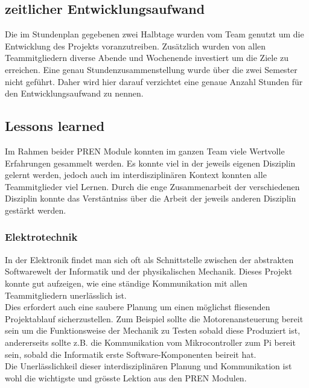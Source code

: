 \documentclass[../../main.tex]{subfiles}
\begin{document}
    \nocite{PiShopPi3ModelBp}
    \nocite{PiShopPiZero}
    \nocite{PiShopBrightPi}
    \nocite{PiShopPiKamera}
    \nocite{PlayZonePassiverBuzzer}
    \nocite{ReicheltStromPi}
    \nocite{ReicheltStromPiAkku}
    \nocite{AliExpressADXL345}
    \nocite{WisIBT2}
    \nocite{WishDCDCConverter}
    \nocite{AliExpressHCSR04}
    \nocite{AliExpressVL53L0X}
    \nocite{AliExpressLM2596}
    \nocite{Distrelec13FR200E}
    \nocite{AliExpress5V33VConverter}
    \nocite{WishTowerpro48}
    \nocite{WishTowerpro48}
    \nocite{MadlerZahnriemen}
    \nocite{MadlerZahnriemenrad}
    \nocite{MadlerKupplung}
    \nocite{MadlerZahnrad}


\pagebreak

\subsection{zeitlicher Entwicklungsaufwand}
Die im Stundenplan gegebenen zwei Halbtage wurden vom Team genutzt um die Entwicklung des Projekts voranzutreiben. Zusätzlich wurden von allen Teammitgliedern diverse Abende und Wochenende investiert um die Ziele zu erreichen. Eine genau Stundenzusammenstellung wurde über die zwei Semester nicht geführt. Daher wird hier darauf verzichtet eine genaue Anzahl Stunden für den Entwicklungsaufwand zu nennen.\\

\subsection{Lessons learned}
Im Rahmen beider PREN Module konnten im ganzen Team viele Wertvolle Erfahrungen gesammelt werden. Es konnte viel in der jeweils eigenen Disziplin gelernt werden, jedoch auch im interdisziplinären Kontext konnten alle Teammitglieder viel Lernen. Durch die enge Zusammenarbeit der verschiedenen Disziplin konnte das Verstäntniss über die Arbeit der jeweils anderen Disziplin gestärkt werden.\\

\subsubsection{Elektrotechnik}
In der Elektronik findet man sich oft als Schnittstelle zwischen der abstrakten Softwarewelt der Informatik und der physikalischen Mechanik. Dieses Projekt konnte gut aufzeigen, wie eine ständige Kommunikation mit allen Teammitgliedern unerlässlich ist.\\
Dies erfordert auch eine saubere Planung um einen möglichst fliesenden Projektablauf sicherzustellen. Zum Beispiel sollte die Motorenansteuerung bereit sein um die Funktionsweise der Mechanik zu Testen sobald diese Produziert ist, andererseits sollte z.B. die Kommunikation vom Mikrocontroller zum Pi bereit sein, sobald die Informatik erste Software-Komponenten beireit hat.\\
Die Unerlässlichkeil dieser interdisziplinären Planung und Kommunikation ist wohl die wichtigste und grösste Lektion aus den PREN Modulen.
\end{document}
